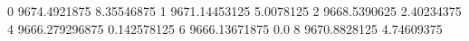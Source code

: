 0 9674.4921875 8.35546875
1 9671.14453125 5.0078125
2 9668.5390625 2.40234375
4 9666.279296875 0.142578125
6 9666.13671875 0.0
8 9670.8828125 4.74609375

